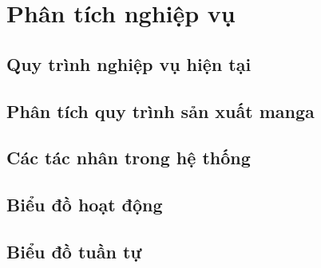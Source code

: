 
\chapter{Phân tích nghiệp vụ}
\label{chap:phan_tich_nghiep_vu}

\section{Quy trình nghiệp vụ hiện tại}
\label{sec:quy_trinh_hien_tai}



\section{Phân tích quy trình sản xuất manga}
\label{sec:quy_trinh_manga}



\section{Các tác nhân trong hệ thống}
\label{sec:tac_nhan}



\section{Biểu đồ hoạt động}
\label{sec:bieu_do_hoat_dong}



\section{Biểu đồ tuần tự}
\label{sec:bieu_do_tuan_tu}

